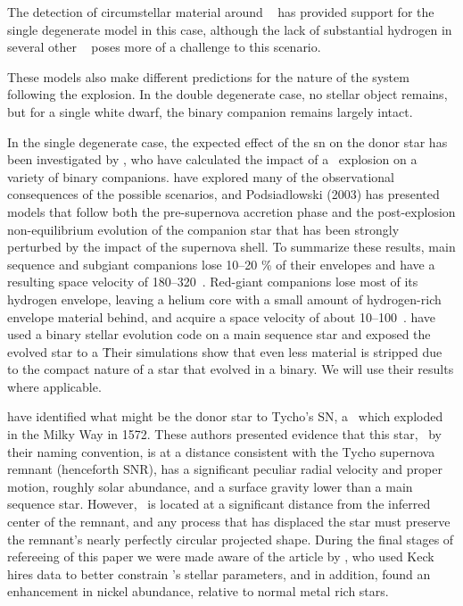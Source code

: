 The detection of circumstellar material around \
\citep{2007Sci...317..924P} has provided support for the single
degenerate model in this case, although the lack of substantial 
hydrogen in several other \sneia\ \citep{2007ApJ...670.1275L} 
poses more of a challenge to this scenario.

These models also make different predictions for the nature of the system
following the explosion. In the double degenerate case, no stellar
object remains, but for a single white dwarf, the binary
companion remains largely intact.

In the single degenerate case, the expected effect of the \gls*{sn} on the
donor star has been investigated by \citet{2000ApJS..128..615M}, who
have calculated the impact of a \snia\ explosion on a variety of binary
companions. \citet{2001ApJ...550L..53C} have explored many of the
observational consequences of the possible scenarios, and
Podsiadlowski (2003) has presented models that follow both the
pre-supernova accretion phase and the post-explosion non-equilibrium
evolution of the companion star that has been strongly perturbed by
the impact of the supernova shell.  To summarize these results,
main sequence and subgiant companions lose 10--20 \% of their
envelopes and have a resulting space velocity of 180--320~\kms . Red-giant companions lose most of its hydrogen envelope, leaving a
helium core with a small amount of hydrogen-rich envelope material behind,
and acquire a space velocity of about 10--100~\kms.
\citet{2008A&A...489..943P} have used a binary stellar evolution code on a main sequence star and exposed the evolved star to a \snia\. Their simulations show that even less material is stripped due to the compact nature of a star that evolved in a binary. We will use their results where applicable. 

\citet[henceforth \rl]{2004Natur.431.1069R} have identified what might
be the donor star to Tycho's SN, a \snia\ which exploded in the Milky
Way in 1572. These authors presented evidence that this star, \starg\
by their naming convention, is at a distance consistent with the Tycho
supernova remnant (henceforth SNR), has a significant peculiar radial
velocity and proper motion, roughly solar abundance, and a surface
gravity lower than a main sequence star. However, \starg\ is located at a significant distance from the
inferred center of the remnant, and any process that has displaced the
star must preserve the remnant's nearly perfectly circular projected shape. During the final stages of refereeing of this paper we were made aware of the article by \citet[henceforth \gh]{2009ApJ...691....1H}, who used Keck \gls{hires} data to better constrain \starg's stellar parameters, and in addition, found an enhancement in nickel abundance, relative to normal metal rich stars.

